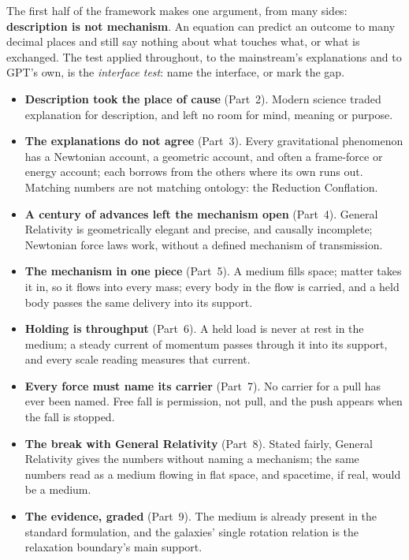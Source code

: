 \documentclass[11pt,a4paper]{article}
\begin{document}
The first half of the framework makes one argument, from many sides: \textbf{description is not mechanism}. An equation can predict an outcome to many decimal places and still say nothing about what touches what, or what is exchanged. The test applied throughout, to the mainstream's explanations and to GPT's own, is the \emph{interface test}: name the interface, or mark the gap.
\begin{itemize}
\item \textbf{Description took the place of cause} (Part~2). Modern science traded explanation for description, and left no room for mind, meaning or purpose.
\item \textbf{The explanations do not agree} (Part~3). Every gravitational phenomenon has a Newtonian account, a geometric account, and often a frame-force or energy account; each borrows from the others where its own runs out. Matching numbers are not matching ontology: the Reduction Conflation.
\item \textbf{A century of advances left the mechanism open} (Part~4). General Relativity is geometrically elegant and precise, and causally incomplete; Newtonian force laws work, without a defined mechanism of transmission.
\item \textbf{The mechanism in one piece} (Part~5). A medium fills space; matter takes it in, so it flows into every mass; every body in the flow is carried, and a held body passes the same delivery into its support.
\item \textbf{Holding is throughput} (Part~6). A held load is never at rest in the medium; a steady current of momentum passes through it into its support, and every scale reading measures that current.
\item \textbf{Every force must name its carrier} (Part~7). No carrier for a pull has ever been named. Free fall is permission, not pull, and the push appears when the fall is stopped.
\item \textbf{The break with General Relativity} (Part~8). Stated fairly, General Relativity gives the numbers without naming a mechanism; the same numbers read as a medium flowing in flat space, and spacetime, if real, would be a medium.
\item \textbf{The evidence, graded} (Part~9). The medium is already present in the standard formulation, and the galaxies' single rotation relation is the relaxation boundary's main support.

\end{itemize}
\end{document}
